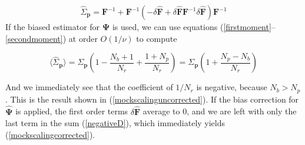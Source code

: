 \documentclass[reprint,aps,prd,superscriptaddress,showkeys,showpacs]{revtex4-1}
\newcommand{\bb}[1]{\mathbf{#1}}
\newcommand{\bbh}[1]{\mathbf{\hat{#1}}}
\newcommand{\h}[1]{\hat{#1}}
\begin{document}
\begin{equation}
\h{\Sigma}_\bb{p} = \bb{F}^{-1} + \bb{F}^{-1}\left(- \delta{\bbh{F}}+ \delta{\bbh{F}}\bb{F}^{-1}\delta{\bbh{F}}\right)\bb{F}^{-1}  
\end{equation}  
%
If the biased estimator for $\bbh{\Psi}$ is used, we can use equations (\ref{firstmoment}--\ref{secondmoment}) at order $O(1/\nu)$ to compute 
\begin{widetext}
\begin{equation}
\label{negativeD}
\langle\h{\Sigma}_\bb{p}\rangle = \Sigma_\bb{p}\left(1-\frac{N_b+1}{N_r}+\frac{1+N_p}{N_r}\right) = \Sigma_\bb{p}\left(1+\frac{N_p-N_b}{N_r}\right)
\end{equation}
\end{widetext}
%
And we immediately see that the coefficient of $1/N_r$ is negative, because $N_b>N_p$. This is the result shown in (\ref{mockscalinguncorrected}). If the bias correction for $\bbh{\Psi}$ is applied, the first order terms $\delta{\bbh{F}}$ average to 0, and we are left with only the last term in the sum (\ref{negativeD}), which immediately yields (\ref{mockscalingcorrected}). 


\label{lastpage}
\end{document}
